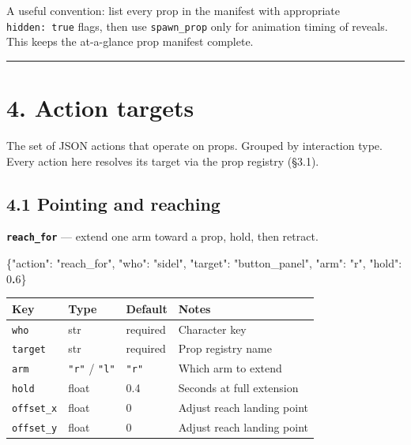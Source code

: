 \documentclass[
  12pt,
  letterpaper,
]{book}
\newenvironment{Shaded}{}{}
\newcommand{\DataTypeTok}[1]{\textcolor[rgb]{0.56,0.13,0.00}{#1}}
\newcommand{\DecValTok}[1]{\textcolor[rgb]{0.25,0.63,0.44}{#1}}
\newcommand{\ErrorTok}[1]{\textcolor[rgb]{1.00,0.00,0.00}{\textbf{#1}}}
\newcommand{\FunctionTok}[1]{\textcolor[rgb]{0.02,0.16,0.49}{#1}}
\newcommand{\StringTok}[1]{\textcolor[rgb]{0.25,0.44,0.63}{#1}}
\begin{document}
A useful convention: list every prop in the manifest with appropriate
\texttt{hidden:\ true} flags, then use \texttt{spawn\_prop} only for
animation timing of reveals. This keeps the at-a-glance prop manifest
complete.

\begin{center}\rule{0.5\linewidth}{0.5pt}\end{center}

\section{4. Action targets}\label{action-targets-1}

The set of JSON actions that operate on props. Grouped by interaction
type. Every action here resolves its target via the prop registry
(§3.1).

\subsection{4.1 Pointing and reaching}\label{pointing-and-reaching}

\textbf{\texttt{reach\_for}} --- extend one arm toward a prop, hold,
then retract.

\begin{Shaded}
\begin{Highlighting}[]
\FunctionTok{\{}\DataTypeTok{"action"}\FunctionTok{:} \StringTok{"reach\_for"}\FunctionTok{,} \DataTypeTok{"who"}\FunctionTok{:} \StringTok{"sidel"}\FunctionTok{,} \DataTypeTok{"target"}\FunctionTok{:} \StringTok{"button\_panel"}\FunctionTok{,}
 \DataTypeTok{"arm"}\FunctionTok{:} \StringTok{"r"}\FunctionTok{,} \DataTypeTok{"hold"}\FunctionTok{:} \DecValTok{0}\ErrorTok{.}\DecValTok{6}\FunctionTok{\}}
\end{Highlighting}
\end{Shaded}

\begin{longtable}[]{@{}llll@{}}
\toprule\noalign{}
Key & Type & Default & Notes \\
\midrule\noalign{}
\endhead
\bottomrule\noalign{}
\endlastfoot
\texttt{who} & str & required & Character key \\
\texttt{target} & str & required & Prop registry name \\
\texttt{arm} & \texttt{"r"} / \texttt{"l"} & \texttt{"r"} & Which arm to
extend \\
\texttt{hold} & float & 0.4 & Seconds at full extension \\
\texttt{offset\_x} & float & 0 & Adjust reach landing point \\
\texttt{offset\_y} & float & 0 & Adjust reach landing point \\
\end{longtable}
\end{document}
